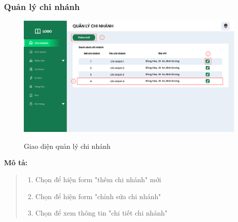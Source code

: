     \subsubsection{Quản lý chi nhánh}
            \begin{figure}[!htp]
                \centering
                \includegraphics[width=12cm]{img/UI/admin/branch.png}
                \label{19}
                \newline
                \caption{Giao diện quản lý chi nhánh}
            \end{figure}
            \textbf{Mô tả:}  
            \begin{quote}
                \begin{enumerate}
                    \item Chọn để hiện form "thêm chi nhánh" mới
                    \item Chọn để hiện form "chỉnh sửa chi nhánh"
                    \item Chọn để xem thông tin "chi tiết chi nhánh"
                \end{enumerate}
            \end{quote}
                
